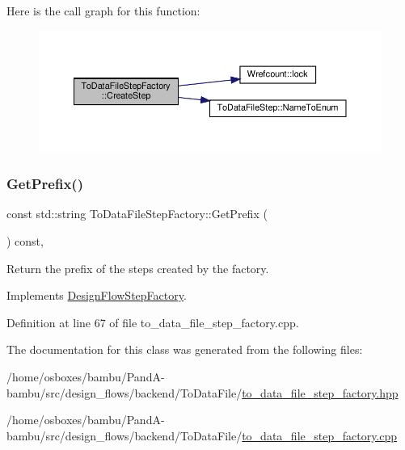 Here is the call graph for this function\+:
\nopagebreak
\begin{figure}[H]
\begin{center}
\leavevmode
\includegraphics[width=350pt]{dc/d99/classToDataFileStepFactory_a851d4679d80e2a754f3adacaa91d9def_cgraph}
\end{center}
\end{figure}
\mbox{\label{classToDataFileStepFactory_abf32d2fdf2cbc501b3d1951f0fb55e93}} 
\subsubsection{\texorpdfstring{Get\+Prefix()}{GetPrefix()}}
{\footnotesize\ttfamily const std\+::string To\+Data\+File\+Step\+Factory\+::\+Get\+Prefix (\begin{DoxyParamCaption}{ }\end{DoxyParamCaption}) const\hspace{0.3cm}{\ttfamily [override]}, {\ttfamily [virtual]}}



Return the prefix of the steps created by the factory. 



Implements \hyperlink{classDesignFlowStepFactory_a52abfc00c170b5a63e84431b75eb698e}{Design\+Flow\+Step\+Factory}.



Definition at line 67 of file to\+\_\+data\+\_\+file\+\_\+step\+\_\+factory.\+cpp.



The documentation for this class was generated from the following files\+:\begin{DoxyCompactItemize}
\item 
/home/osboxes/bambu/\+Pand\+A-\/bambu/src/design\+\_\+flows/backend/\+To\+Data\+File/\hyperlink{to__data__file__step__factory_8hpp}{to\+\_\+data\+\_\+file\+\_\+step\+\_\+factory.\+hpp}\item 
/home/osboxes/bambu/\+Pand\+A-\/bambu/src/design\+\_\+flows/backend/\+To\+Data\+File/\hyperlink{to__data__file__step__factory_8cpp}{to\+\_\+data\+\_\+file\+\_\+step\+\_\+factory.\+cpp}\end{DoxyCompactItemize}
